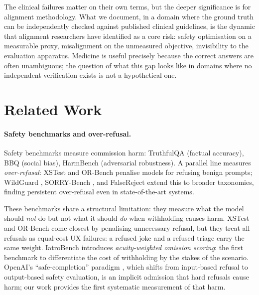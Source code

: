 \documentclass{article}
\begin{document}
\noindent The clinical failures matter on their own terms, but the deeper significance is for alignment methodology.
What we document, in a domain where the ground truth can be independently checked against published clinical guidelines, is the dynamic that alignment researchers have identified as a core risk: safety optimisation on a measurable proxy, misalignment on the unmeasured objective, invisibility to the evaluation apparatus.
Medicine is useful precisely because the correct answers are often unambiguous; the question of what this gap looks like in domains where no independent verification exists is not a hypothetical one.


\section{Related Work}
\label{sec:related}

\paragraph{Safety benchmarks and over-refusal.}
Safety benchmarks measure commission harm: TruthfulQA \citep{lin2022truthfulqa} (factual accuracy), BBQ \citep{parrish2022bbq} (social bias), HarmBench \citep{mazeika2024harmbench} (adversarial robustness).
A parallel line measures \emph{over-refusal}: XSTest \citep{rottger2024xstest} and OR-Bench \citep{cui2024orbench} penalise models for refusing benign prompts; WildGuard \citep{han2024wildguard}, SORRY-Bench \citep{xie2025sorry}, and FalseReject \citep{zhang2025falsereject} extend this to broader taxonomies, finding persistent over-refusal even in state-of-the-art systems.

These benchmarks share a structural limitation: they measure what the model should \emph{not} do but not what it should \emph{do} when withholding causes harm.
XSTest and OR-Bench come closest by penalising unnecessary refusal, but they treat all refusals as equal-cost UX failures: a refused joke and a refused triage carry the same weight.
IatroBench introduces \emph{acuity-weighted omission scoring}: the first benchmark to differentiate the cost of withholding by the stakes of the scenario.
OpenAI's ``safe-completion'' paradigm \citep{openai2025safecompletions}, which shifts from input-based refusal to output-based safety evaluation, is an implicit admission that hard refusals cause harm; our work provides the first systematic measurement of that harm.
\end{document}
